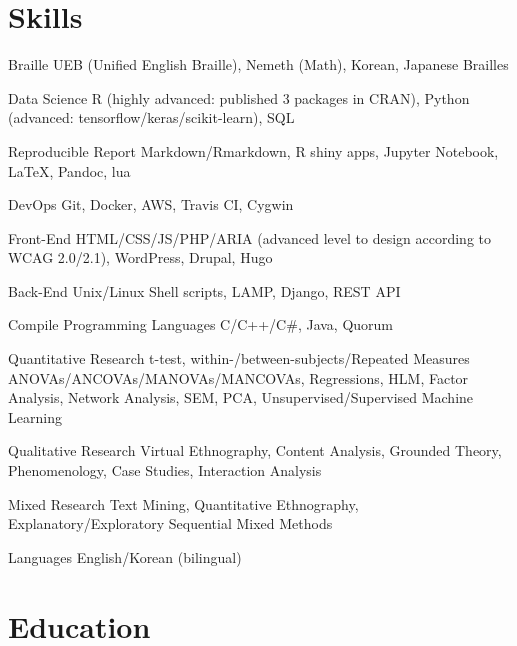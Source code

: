 \documentclass[11pt, a4paper]{awesome-cv}
\begin{document}
\hypertarget{skills}{%
\section{Skills}\label{skills}}

\begin{cvskills}
  \cvskill
    {Braille}
    {UEB (Unified English Braille), Nemeth (Math), Korean, Japanese Brailles}

  \cvskill
    {Data Science}
    {R (highly advanced: published 3 packages in CRAN), Python (advanced: tensorflow/keras/scikit-learn), SQL}

  \cvskill
    {Reproducible Report}
    {Markdown/Rmarkdown, R shiny apps, Jupyter Notebook, LaTeX, Pandoc, lua}

  \cvskill
    {DevOps}
    {Git, Docker, AWS, Travis CI, Cygwin}

  \cvskill
    {Front-End}
    {HTML/CSS/JS/PHP/ARIA (advanced level to design according to WCAG 2.0/2.1), WordPress, Drupal, Hugo}

  \cvskill
    {Back-End}
    {Unix/Linux Shell scripts, LAMP, Django, REST API}

  \cvskill
    {Compile Programming Languages}
    {C/C++/C\#, Java, Quorum}

  \cvskill
    {Quantitative Research}
    {t-test, within-/between-subjects/Repeated Measures ANOVAs/ANCOVAs/MANOVAs/MANCOVAs, Regressions, \newline HLM, Factor Analysis, Network Analysis, SEM, PCA, Unsupervised/Supervised Machine Learning}

  \cvskill
    {Qualitative Research}
    {Virtual Ethnography, Content Analysis, Grounded Theory, Phenomenology, Case Studies, Interaction Analysis}

  \cvskill
    {Mixed Research}
    {Text Mining, Quantitative Ethnography, Explanatory/Exploratory Sequential Mixed Methods}

  \cvskill
    {Languages}
    {English/Korean (bilingual)}
\end{cvskills}

\hypertarget{education}{%
\section{Education}\label{education}}
\end{document}
